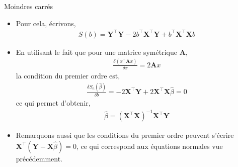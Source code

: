 \begin{frame}[allowframebreaks]{Moindres carrés}
\begin{itemize}
\item Pour cela, écrivons,
\begin{align*}
S(b) = \mathbf{Y}^\top\mathbf{Y} - 2b^\top\mathbf{X}^\top\mathbf{Y}+b^\top\mathbf{X}^\top\mathbf{X}b
\end{align*}
\item En utilisant le fait que pour une matrice symétrique $\mathbf{A}$,
\begin{align*}
\frac{\delta (x^\top\mathbf{A}x)}{\delta x} = 2\mathbf{A}x
\end{align*}
la condition du premier ordre est,
\begin{align*}
\frac{\delta S_n(\widehat{\beta})}{\delta b} = -2\mathbf{X}^\top\mathbf{Y} + 2\mathbf{X}^\top\mathbf{X}\widehat{\beta} = 0
\end{align*}
ce qui permet d'obtenir,
\begin{align*}
\widehat{\beta} = (\mathbf{X}^\top\mathbf{X})^{-1}\mathbf{X}^\top\mathbf{Y}
\end{align*}
\item Remarquons aussi que les conditions du premier ordre peuvent s'écrire $\mathbf{X}^\top(\mathbf{Y} - \mathbf{X}\widehat{\beta}) = 0$, ce qui correspond aux équations normales vue précédemment.
\end{itemize}
\end{frame}

